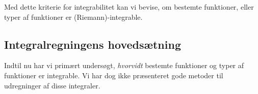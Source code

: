 Med dette kriterie for integrabilitet kan vi bevise, om bestemte funktioner, eller typer af funktioner er (Riemann)-integrable.


\subsection{Integralregningens hovedsætning}%
\label{sub:Integralregningens hovedsætning}
Indtil nu har vi primært undersøgt, \textit{hvorvidt} bestemte funktioner og typer af funktioner er integrable.
Vi har dog ikke præsenteret gode metoder til udregninger af disse integraler.
